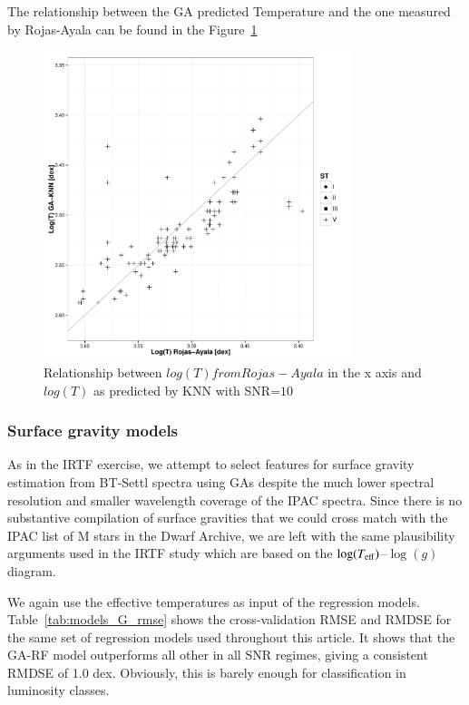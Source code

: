 The relationship between the GA predicted Temperature and the one
measured by Rojas-Ayala can be found in the
Figure~\ref{fig:ipac_lt_lt}
\begin{figure}
 \begin{center}
 \includegraphics[width=9cm]{figs/ipac_LG_Trojas_Tknn_10.pdf}
 \caption{Relationship between $log(T) from Rojas-Ayala $ in the x axis 
 and $log(T)$ as predicted by KNN with SNR=$10$}
 \label{fig:ipac_lt_lt}
 \end{center}
\end{figure}

\subsubsection{Surface gravity models}

As in the IRTF exercise, we attempt to select features for surface
gravity estimation from BT-Settl spectra using GAs despite the much
lower spectral resolution and smaller wavelength coverage of the IPAC
spectra. Since there is no substantive compilation of surface
gravities that we could cross match with the IPAC list of M stars in
the Dwarf Archive, we are left with the same plausibility arguments
used in the IRTF study which are based on the $\log(T_{\rm
  eff})$--$\log(g)$ diagram.

We again use the effective temperatures as input of the regression
models. Table~\ref{tab:models_G_rmse} shows the cross-validation RMSE
and RMDSE for the same set of regression models used throughout this
article. It shows that the GA-RF model outperforms all other in all
SNR regimes, giving a consistent RMDSE of 1.0 dex. Obviously, this is
barely enough for classification in luminosity classes.

